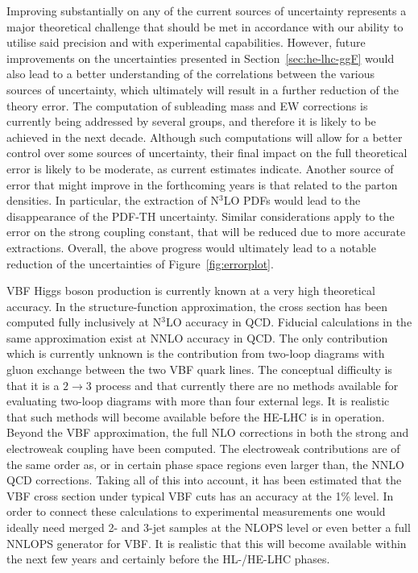 \label{sec:hl-lhc-ggF}
Improving substantially on any of the current
sources of uncertainty represents a major theoretical challenge that
should be met in accordance with our ability to utilise said precision
and with experimental capabilities.
However, future improvements on the uncertainties presented in
Section~\ref{sec:he-lhc-ggF} would also lead to a better
understanding of the correlations between the various sources of
uncertainty, which ultimately will result in a further reduction of the theory
error. The computation of subleading mass and EW corrections is
currently being addressed by several groups, and therefore it is
likely to be achieved in the next decade. Although such computations
will allow for a better control over some sources of uncertainty,
their final impact on the full theoretical error is likely to be
moderate, as current estimates indicate.
%
Another source of error that might improve in the forthcoming years is
that related to the parton densities. In particular, the extraction of
N$^3$LO PDFs would lead to the disappearance of the PDF-TH
uncertainty. Similar considerations apply to the error on the strong
coupling constant, that will be reduced due to more accurate
extractions. Overall, the above progress would ultimately lead to a
notable reduction of the uncertainties of Figure~\ref{fig:errorplot}.


\label{sec:hl-lhc-VBF}

VBF Higgs boson production is currently known at a very high theoretical accuracy. In
the structure-function approximation, the cross section has been computed fully inclusively at
N$^3$LO accuracy in QCD. Fiducial calculations in the same approximation exist at NNLO accuracy in QCD. The
only contribution which is currently unknown is the contribution from two-loop
diagrams with gluon exchange between the two VBF quark lines. The conceptual
difficulty is that it is a $2 \to 3$ process and that currently there are no methods
available for evaluating two-loop diagrams with more than four external legs. It is
realistic that such methods will become available before the HE-LHC is in
operation. Beyond the VBF approximation, the full NLO corrections in both the
strong and electroweak coupling have been computed. The electroweak
contributions are of the same order as, or in certain phase space regions even
larger than, the NNLO QCD corrections. Taking all of this into account, it has
been estimated that the VBF cross section under typical VBF cuts has an accuracy
at the 1\% level. In order to connect these calculations to experimental
measurements one would ideally need merged 2- and 3-jet samples at the NLOPS
level or even better a full NNLOPS generator for VBF. It is realistic that this
will become available within the next few years and certainly before the
HL-/HE-LHC phases.

